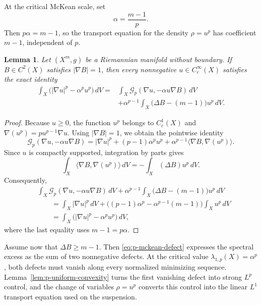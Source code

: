 \documentclass[12pt]{amsart}
\newtheorem{lemma}[theorem]{Lemma}
\theoremstyle{definition}
\numberwithin{equation}{section}
\newcommand{\mc}{\mathcal}
\begin{document}
At the critical McKean scale, set
\begin{equation}\label{eq:p-critical-parameter}
  \alpha=\frac{m-1}{p}.
\end{equation}
Then \(p\alpha=m-1\), so the transport equation for the density
\(\rho=u^p\) has coefficient \(m-1\), independent of \(p\).

\begin{lemma}\label{lem:p-mckean-defect}
Let \((X^m,g)\) be a Riemannian manifold without boundary.  If
\(B\in C^2(X)\) satisfies \(|\nabla B|=1\), then every nonnegative
\(u\in C_c^\infty(X)\) satisfies the exact identity
\begin{equation}\label{eq:p-mckean-defect}
\begin{aligned}
  \int_X\bigl(|\nabla u|^p-\alpha^pu^p\bigr)\,dV
  ={}&\int_X\mc G_p(\nabla u,-\alpha u\nabla B)\,dV\\
     &+\alpha^{p-1}\int_X
       \bigl(\Delta B-(m-1)\bigr)u^p\,dV.
\end{aligned}
\end{equation}
\end{lemma}

\begin{proof}
Because \(u\geq0\), the function \(u^p\) belongs to \(C_c^1(X)\) and
\(\nabla(u^p)=pu^{p-1}\nabla u\).  Using \(|\nabla B|=1\), we obtain
the pointwise identity
\[
  \mc G_p(\nabla u,-\alpha u\nabla B)
  =|\nabla u|^p+(p-1)\alpha^pu^p
   +\alpha^{p-1}\langle\nabla B,\nabla(u^p)\rangle.
\]
Since \(u\) is compactly supported, integration by parts gives
\[
  \int_X\langle\nabla B,\nabla(u^p)\rangle\,dV
  =-\int_X(\Delta B)u^p\,dV.
\]
Consequently,
\[
\begin{aligned}
 &\int_X\mc G_p(\nabla u,-\alpha u\nabla B)\,dV
  +\alpha^{p-1}\int_X
    \bigl(\Delta B-(m-1)\bigr)u^p\,dV\\
 &\qquad
  =\int_X|\nabla u|^p\,dV
   +\bigl((p-1)\alpha^p-\alpha^{p-1}(m-1)\bigr)
      \int_Xu^p\,dV\\
 &\qquad
  =\int_X\bigl(|\nabla u|^p-\alpha^pu^p\bigr)\,dV,
\end{aligned}
\]
where the last equality uses \(m-1=p\alpha\).
\end{proof}

Assume now that \(\Delta B\geq m-1\).  Then
\eqref{eq:p-mckean-defect} expresses the spectral excess as the sum of
two nonnegative defects.  At the critical value
\(\lambda_{1,p}(X)=\alpha^p\), both defects must vanish along every
normalized minimizing sequence.  Lemma~\ref{lem:p-uniform-convexity}
turns the first vanishing defect into strong \(L^p\) control, and the
change of variables \(\rho=u^p\) converts this control into the linear
\(L^1\) transport equation used on the suspension.
\end{document}
